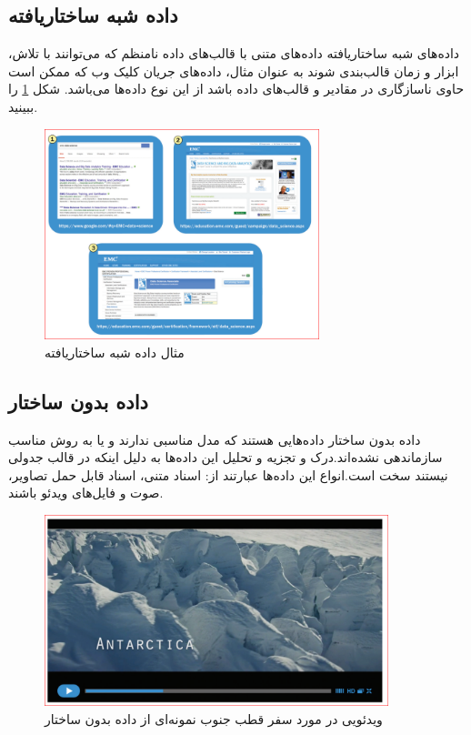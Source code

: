 \subsection{داده شبه ساختاریافته}
داده‌های شبه ساختاریافته
داده‌های متنی با قالب‌های داده نامنظم که می‌توانند با تلاش، ابزار و زمان قالب‌بندی شوند به عنوان مثال، داده‌های جریان کلیک وب که ممکن است حاوی ناسازگاری در مقادیر و قالب‌های داده باشد از این نوع داده‌ها می‌باشد. شکل
\ref{r_exp_quasi}
را ببینید.
\begin{figure}[H]
	\centering
		\includegraphics[width=8cm]{exp_quasi_structured.png}
	\caption{مثال داده شبه ساختاریافته}
\label{r_exp_quasi}
\end{figure}

\subsection{داده بدون ساختار}
داده‌ بدون ساختار
داده‌هایی هستند که مدل مناسبی ندارند و یا به روش مناسب سازماندهی نشده‌اند.درک و تجزیه و تحلیل این داده‌ها به دلیل اینکه در قالب جدولی نیستند سخت است.انواع این داده‌ها عبارتند از: اسناد متنی، اسناد قابل حمل
تصاویر، صوت و فایل‌های ویدئو باشند.

\begin{figure}[h]
	\centering
	\includegraphics[width=10cm]{exp_unstructured_data.png}
	\caption{ویدئویی در مورد سفر قطب جنوب نمونه‌ای از داده بدون ساختار}
\end{figure}

